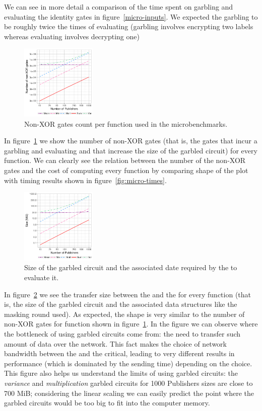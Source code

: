 We can see in more detail a comparison of the time spent on garbling and
evaluating the identity gates in figure~\ref{micro-inputs}.  We expected the
garbling to be roughly twice the times of evaluating (garbling involves
encrypting two labels whereas evaluating involves decrypting one)

\begin{figure}
  \includegraphics[width=0.32\textwidth]{plots/nonxor_gates_log.png}
  \caption{Non-XOR gates count per function used in the microbenchmarks.}
  \label{micro-nonxor}
\end{figure}

In figure~\ref{micro-nonxor} we show the number of non-XOR gates (that is, the
gates that incur a garbling and evaluating and that increase the size of the
garbled circuit) for every function.  We can clearly see the relation between
the number of the non-XOR gates and the cost of computing every function by
comparing shape of the plot with timing results shown in
figure~\ref{fig:micro-times}.

\begin{figure}
  \includegraphics[width=0.32\textwidth]{plots/size_log.png}
  \caption{Size of the garbled circuit and the associated date required by the
    \broker to evaluate it.}
  \label{micro-sizes}
\end{figure}

In figure~\ref{micro-sizes} we see the transfer size between the \broker and
the \garbler for every function (that is, the size of the garbled circuit and
the associated data structures like the masking round used).  As expected, the
shape is very similar to the number of non-XOR gates for function shown in
figure~\ref{micro-nonxor}.  In the figure we can observe where the bottleneck
of using garbled circuits come from: the need to transfer such amount of data
over the network.  This fact makes the choice of network bandwidth between the
\broker and the \garbler critical, leading to very different results in
performance (which is dominated by the sending time) depending on the choice.
This figure also helps us understand the limits of using garbled circuits: the
\emph{variance} and \emph{multiplication} garbled circuits for 1000 Publishers
sizes are close to 700 MiB; considering the linear scaling we can easily
predict the point where the garbled circuits would be too big to fit into the
computer memory.

